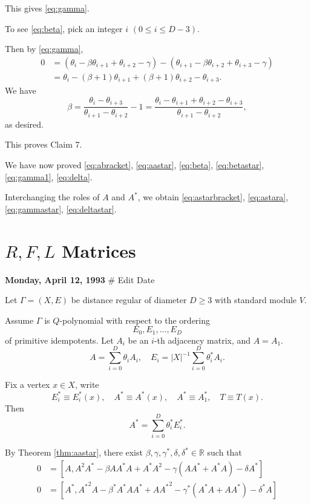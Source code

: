 \documentclass[
]{book}
\theoremstyle{definition}
\theoremstyle{definition}
\theoremstyle{definition}
\theoremstyle{definition}
\theoremstyle{remark}
\begin{document}
This gives \eqref{eq:gamma}.

To see \eqref{eq:beta}, pick an integer \(i\) \((0\leq i\leq D-3)\).

Then by \eqref{eq:gamma},
\begin{align}
0 & = (\theta_i - \beta\theta_{i+1} + \theta_{i+2} - \gamma) - (\theta_{i+1} - \beta\theta_{i+2} + \theta_{i+3} - \gamma) \\
& = \theta_i-(\beta+1)\theta_{i+1} + (\beta+1)\theta_{i+2} - \theta_{i+3}.
\end{align}
We have
\[\beta = \frac{\theta_i-\theta_{i+3}}{\theta_{i+1}-\theta_{i+2}} - 1 = \frac{\theta_i-\theta_{i+1}+\theta_{i+2}-\theta_{i+3}}{\theta_{i+1}-\theta_{i+2}},\]
as desired.

This proves Claim 7.

We have now proved \eqref{eq:abracket}, \eqref{eq:aastar}, \eqref{eq:beta}, \eqref{eq:betastar}, \eqref{eq:gamma1}, \eqref{eq:delta}.

Interchanging the roles of \(A\) and \(A^*\), we obtain \eqref{eq:astarbracket}, \eqref{eq:astara}, \eqref{eq:gammastar}, \eqref{eq:deltastar}.

\hypertarget{lec30}{%
\chapter{\texorpdfstring{\(R, F, L\) Matrices}{R, F, L Matrices}}\label{lec30}}

\textbf{Monday, April 12, 1993} \# Edit Date

Let \(\Gamma = (X, E)\) be distance regular of diameter \(D\geq 3\) with standard module \(V\).

Assume \(\Gamma\) is \(Q\)-polynomial with respect to the ordering
\[E_0, E_1, \ldots, E_D\]
of primitive idempotents. Let \(A_i\) be an \(i\)-th adjacency matrix, and \(A = A_1\).
\[A = \sum_{i=0}^D\theta_i A_i, \quad E_i = |X|^{-1}\sum_{i=0}^D\theta^*_i A_i.\]

Fix a vertex \(x\in X\), write
\[E^*_i \equiv E^*_i(x), \quad A^*\equiv A^*(x), \quad A^* \equiv A^*_1, \quad T\equiv T(x).\]
Then
\[A^* = \sum_{i=0}^D \theta^*_i E^*_i.\]

By Theorem \ref{thm:aastar}, there exist \(\beta, \gamma, \gamma^*, \delta, \delta^*\in \mathbb{R}\) such that
\begin{align}
0 & = [A, A^2A^*-\beta AA^*A + A^*A^2 - \gamma(AA^*+A^*A) - \delta A^*]\\
0 & = [A^*, {A^*}^2A-\beta^* A^*AA^* + A{A^*}^2 - \gamma^*(A^*A+AA^*) - \delta^* A]
\end{align}
\end{document}
